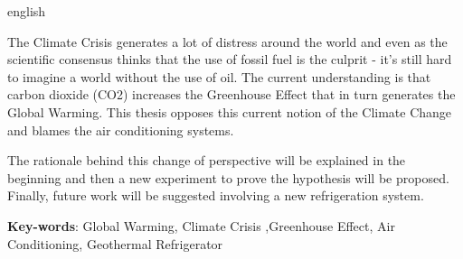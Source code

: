 
\begin{resumo}[Abstract]
 \begin{otherlanguage*}{english}

The Climate Crisis generates a lot of distress around the world and even as the scientific consensus thinks that the use of fossil fuel is the culprit - it's still hard to imagine a world without the use of oil. The current understanding is that carbon dioxide (CO2) increases the Greenhouse Effect that in turn generates the Global Warming. This thesis opposes this current notion of the Climate Change and blames the air conditioning systems.
\par
The rationale behind this change of perspective will be explained in the beginning and then a new experiment to prove the hypothesis will be proposed. Finally, future work will be suggested involving a new refrigeration system.

    \vspace{\onelineskip}
    \noindent 
    \textbf{Key-words}: Global Warming, Climate Crisis ,Greenhouse Effect, Air Conditioning, Geothermal Refrigerator
 \end{otherlanguage*}
\end{resumo}

